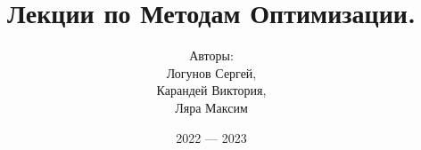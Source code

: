 \documentclass{article}
\begin{document}
\title{Лекции по Методам Оптимизации.}
\author{Авторы: \\
Логунов Сергей, \\
Карандей Виктория, \\
Ляра Максим}
\date{2022 --- 2023}
\maketitle
\thispagestyle{empty}

\newpage
\thispagestyle{empty}
\tableofcontents


\Large %
\setlength{\baselineskip}{20pt} %











\end{document}
